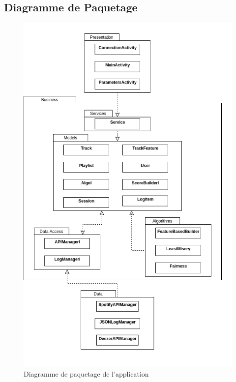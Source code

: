 \documentclass{article}
\begin{document}
		\subsection{Diagramme de Paquetage}    
		\begin{figure}[h!]
		    \center
			\includegraphics[scale=0.5]{ressources/diagramme_paquetage.png}
			\caption{Diagramme de paquetage de l'application}
			\label{fig:package_diag}
		\end{figure}
		\newpage
\end{document}
